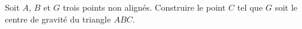 
Soit $A$, $B$ et $G$ trois points non alignés. Construire le point $C$ tel que $G$ soit le centre de gravité du triangle $ABC$.